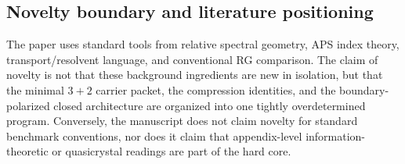 \documentclass[11pt,a4paper]{article}
\theoremstyle{definition}
\theoremstyle{remark}
\begin{document}
\subsection{Novelty boundary and literature positioning}

The paper uses standard tools from relative spectral geometry, APS index theory, transport/resolvent language, and conventional RG comparison. The claim of novelty is not that these background ingredients are new in isolation, but that the minimal $3+2$ carrier packet, the compression identities, and the boundary-polarized closed architecture are organized into one tightly overdetermined program. Conversely, the manuscript does not claim novelty for standard benchmark conventions, nor does it claim that appendix-level information-theoretic or quasicrystal readings are part of the hard core.
\end{document}
